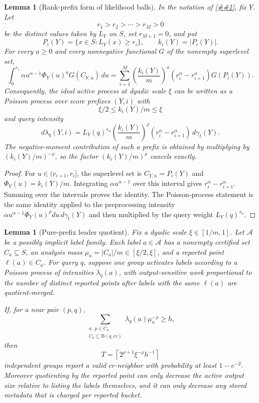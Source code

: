 \documentclass[10pt]{article}
\newcommand{\cref}[1]{\ref{##1}}
\newtheorem{lemma}[theorem]{Lemma}
\theoremstyle{definition}
\newcommand{\Ball}{\mathrm{B}}
\begin{document}
\begin{lemma}[Rank-prefix form of likelihood balls]\label{lem:likelihood-rank-prefix}
   In the notation of \cref{thm:continuous-likelihood-balls}, fix $Y$. Let
   \[
      r_1>r_2>\cdots>r_M>0
   \]
   be the distinct values taken by $L_Y$ on $S$, set $r_{M+1}=0$, and put
   \[
      P_i(Y)=\{x\in S:L_Y(x)\ge r_i\},
      \qquad
      k_i(Y)=|P_i(Y)|.
   \]
   For every $a\ge0$ and every nonnegative functional $G$ of the nonempty
   superlevel set,
   \[
      \int_0^{r_1}\alpha u^{\alpha-1}\Phi_Y(u)^a
      G(C_{Y,u})\,du
      =
      \sum_{i=1}^M
      \left(\frac{k_i(Y)}m\right)^a
      \left(r_i^\alpha-r_{i+1}^\alpha\right)G(P_i(Y)).
   \]
   Consequently, the ideal active process at dyadic scale $\xi$ can be written
   as a Poisson process over score prefixes $(Y,i)$ with
   \[
      \xi/2\le k_i(Y)/m\le\xi
   \]
   and query intensity
   \[
      d\lambda_q(Y,i)
      =
      L_Y(q)^{s_\alpha}
      \left(\frac{k_i(Y)}m\right)^\rho
      \left(r_i^\alpha-r_{i+1}^\alpha\right)\,d\gamma_t(Y).
   \]
   The negative-moment contribution of such a prefix is obtained by multiplying
   by $(k_i(Y)/m)^{-\rho}$, so the factor $(k_i(Y)/m)^\rho$ cancels exactly.
\end{lemma}

\begin{proof}
   For $u\in(r_{i+1},r_i]$, the superlevel set is $C_{Y,u}=P_i(Y)$ and
   $\Phi_Y(u)=k_i(Y)/m$. Integrating $\alpha u^{\alpha-1}$ over this interval
   gives $r_i^\alpha-r_{i+1}^\alpha$. Summing over the intervals proves the
   identity. The Poisson-process statement is the same identity applied to the
   preprocessing intensity
   $\alpha u^{\alpha-1}\Phi_Y(u)^\rho du\,d\gamma_t(Y)$ and then multiplied by
   the query weight $L_Y(q)^{s_\alpha}$.
\end{proof}

\begin{lemma}[Pure-prefix leader quotient]\label{lem:pure-prefix-leader-quotient}
   Fix a dyadic scale \(\xi\in[1/m,1]\).  Let \(\mathcal A\) be a possibly
   implicit label family.  Each label \(a\in\mathcal A\) has a nonempty
   certified set \(C_a\subseteq S\), an analysis mass
   \(\mu_a=|C_a|/m\in[\xi/2,\xi]\), and a reported point
   \(\ell(a)\in C_a\).  For query \(q\), suppose one group activates labels
   according to a Poisson process of intensities \(\lambda_q(a)\), with
   output-sensitive work proportional to the number of distinct reported
   points after labels with the same \(\ell(a)\) are quotient-merged.

   If, for a near pair \((p,q)\),
   \[
      \sum_{\substack{a:\ p\in C_a\\ C_a\subseteq\Ball(q,cr)}}
      \lambda_q(a)\mu_a^{-\rho}\ge h,
      \tag{LQ1}
   \]
   then
   \[
      T=\left\lceil 2^{\rho+1}\xi^{-\rho}h^{-1}\right\rceil
   \]
   independent groups report a valid \(cr\)-neighbor with probability at least
   \(1-e^{-2}\).  Moreover quotienting by the reported point can only decrease
   the active output size relative to listing the labels themselves, and it
   can only decrease any stored metadata that is charged per reported bucket.
\end{lemma}
\end{document}
